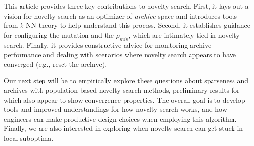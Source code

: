 \documentclass[twoside]{article}
\begin{document}
This article provides three key contributions to novelty search.  First, it lays out a  vision for novelty search as an optimizer of \emph{archive} space and introduces tools from $k$-NN theory to help understand this process.  Second, it establishes guidance for configuring the mutation and the $\rho_{min}$, which are intimately tied in novelty search.  Finally, it provides constructive advice for monitoring archive performance and dealing with scenarios where novelty search appears to have converged (e.g., reset the archive).  

Our next step will be to empirically explore these questions about sparseness and archives with population-based novelty search methods, preliminary results for which also appear to show convergence properties.  
The overall goal is to develop tools and improved understandings for how novelty search works, and how engineers can make productive design choices when employing this algorithm.  Finally, we are also interested in exploring when novelty search can get stuck in local suboptima.

\small



\end{document}
